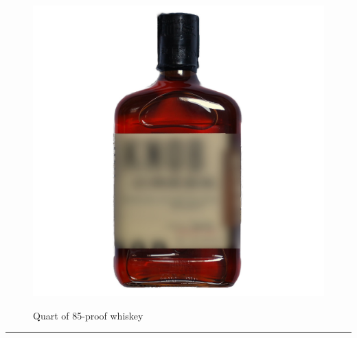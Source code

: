 \documentclass{article}
\begin{document}
    \begin{figure}[H]
        \centering
        \begin{minipage}{0.25\textwidth}
            \centering
            \includegraphics[width=\textwidth]{../SurvivalItemImages/whiskey}
        \end{minipage}\hfill
        \begin{minipage}{0.7\textwidth}
            \centering
            \Large Quart of 85-proof whiskey
        \end{minipage}
    \end{figure}
    \vspace{-0.8em}
    \noindent\rule{\textwidth}{0.4pt}
            
\end{document}

